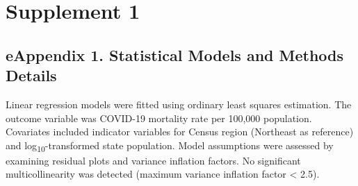\documentclass[10pt, letterpaper]{article}
\begin{document}
\vspace{6pt}
\noindent{\color{jamalightgray}\rule{\textwidth}{0.4pt}}
\vspace{4pt}





{\fontsize{8.5}{10.5}\selectfont


}


\clearpage
\section*{Supplement 1}

\subsection*{eAppendix 1. Statistical Models and Methods Details}
Linear regression models were fitted using ordinary least squares estimation. The outcome variable was COVID-19 mortality rate per 100,000 population. Covariates included indicator variables for Census region (Northeast as reference) and log\textsubscript{10}-transformed state population. Model assumptions were assessed by examining residual plots and variance inflation factors. No significant multicollinearity was detected (maximum variance inflation factor < 2.5).
\end{document}
